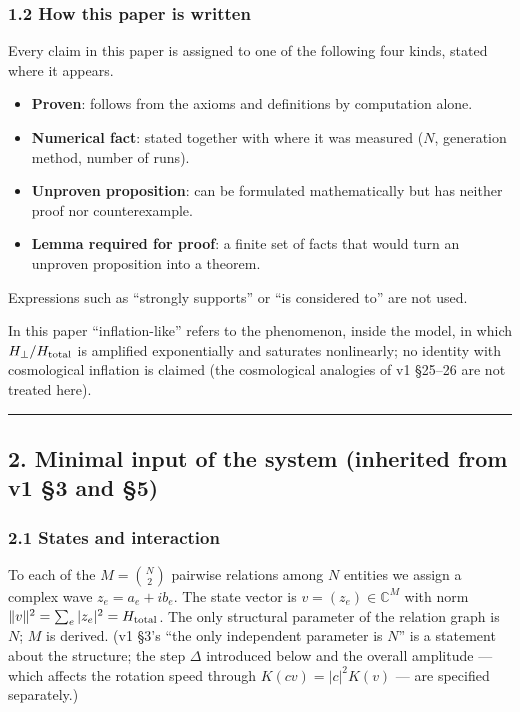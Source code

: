 \documentclass[
  10pt,
  a4paper,
]{article}
\providecommand{\tightlist}{%
  \setlength{\itemsep}{0pt}\setlength{\parskip}{0pt}}
\begin{document}
\subsubsection{1.2 How this paper is
written}\label{how-this-paper-is-written}

Every claim in this paper is assigned to one of the following four
kinds, stated where it appears.

\begin{itemize}
\tightlist
\item
  \textbf{Proven}: follows from the axioms and definitions by
  computation alone.
\item
  \textbf{Numerical fact}: stated together with where it was measured
  (\(N\), generation method, number of runs).
\item
  \textbf{Unproven proposition}: can be formulated mathematically but
  has neither proof nor counterexample.
\item
  \textbf{Lemma required for proof}: a finite set of facts that would
  turn an unproven proposition into a theorem.
\end{itemize}

Expressions such as ``strongly supports'' or ``is considered to'' are
not used.

In this paper ``inflation-like'' refers to the phenomenon, inside the
model, in which \(H_\perp/H_{\rm total}\) is amplified exponentially and
saturates nonlinearly; no identity with cosmological inflation is
claimed (the cosmological analogies of v1 §25--26 are not treated here).

\begin{center}\rule{0.5\linewidth}{0.5pt}\end{center}

\subsection{2. Minimal input of the system (inherited from v1 §3 and
§5)}\label{minimal-input-of-the-system-inherited-from-v1-3-and-5}

\subsubsection{2.1 States and interaction}\label{states-and-interaction}

To each of the \(M=\binom N2\) pairwise relations among \(N\) entities
we assign a complex wave \(z_e=a_e+ib_e\). The state vector is
\(v=(z_e)\in\mathbb C^M\) with norm
\(\|v\|^2=\sum_e|z_e|^2=H_{\rm total}\). The only structural parameter
of the relation graph is \(N\); \(M\) is derived. (v1 §3's ``the only
independent parameter is \(N\)'' is a statement about the structure; the
step \(\Delta\) introduced below and the overall amplitude --- which
affects the rotation speed through \(K(cv)=|c|^2K(v)\) --- are specified
separately.)
\end{document}
